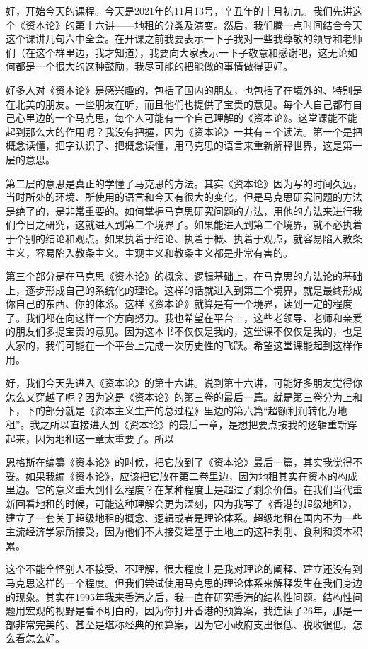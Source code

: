 \documentclass[UTF8, 12pt, a4paper]{ctexrep}
\begin{document}
好，开始今天的课程。今天是2021年的11月13号，辛丑年的十月初九。我们先讲这个《资本论》的第十六讲——地租的分类及演变。然后，我们腾一点时间结合今天这个课讲几句六中全会。在开课之前我要表示一下子我对一些我尊敬的领导和老师们（在这个群里边，我才知道），我要向大家表示一下子敬意和感谢吧，这无论如何都是一个很大的这种鼓励，我尽可能的把能做的事情做得更好。

好多人对《资本论》是感兴趣的，包括了国内的朋友，也包括了在境外的、特别是在北美的朋友。一些朋友在听，而且他们也提供了宝贵的意见。每个人自己都有自己心里边的一个马克思，每个人可能有一个自己理解的《资本论》。这堂课能不能起到那么大的作用呢？我没有把握，因为《资本论》一共有三个读法。第一个是把概念读懂，把字认识了、把概念读懂，用马克思的语言来重新解释世界，这是第一层的意思。

第二层的意思是真正的学懂了马克思的方法。其实《资本论》因为写的时间久远，当时所处的环境、所使用的语言和今天有很大的变化，但是马克思研究问题的方法是绝了的，是非常重要的。如何掌握马克思研究问题的方法，用他的方法来进行我们今日之研究，这就进入到第二个境界了。如果能进入到第二个境界，就不必执着于个别的结论和观点。如果执着于结论、执着于概、执着于观点，就容易陷入教条主义，容易陷入教条主义。主观主义和教条主义都是非常有害的。

第三个部分是在马克思《资本论》的概念、逻辑基础上，在马克思的方法论的基础上，逐步形成自己的系统化的理论。这样的话就进入到第三个境界，就是最终形成你自己的东西、你的体系。这样《资本论》就算是有一个境界，读到一定的程度了。我们都在向这样一个方向努力。我也希望在平台上，这些老领导、老师和亲爱的朋友们多提宝贵的意见。因为这本书不仅仅是我的，这堂课不仅仅是我的，也是大家的，我们可能在一个平台上完成一次历史性的飞跃。希望这堂课能起到这样作用。

好，我们今天先进入《资本论》的第十六讲。说到第十六讲，可能好多朋友觉得你怎么又穿越了呢？因为这是《资本论》的第三卷的最后一篇。就是第三卷分为上和下，下的部分就是《资本主义生产的总过程》里边的第六篇“超额利润转化为地租”。我之所以直接进入到《资本论》的最后一章，是想把要点按我的逻辑重新穿起来，因为地租这一章太重要了。所以

恩格斯在编纂《资本论》的时候，把它放到了《资本论》最后一篇，其实我觉得不妥。如果我编《资本论》，应该把它放在第二卷里边，因为地租其实在资本的构成里边。它的意义重大到什么程度？在某种程度上是超过了剩余价值。在我们当代重新回看地租的时候，可能这种理解会更为深刻，因为我写了《香港的超级地租》，建立了一套关于超级地租的概念、逻辑或者是理论体系。超级地租在国内不为一些主流经济学家所接受，因为他们不大接受建基于土地上的这种剥削、食利和资本积累。

这个不能全怪别人不接受、不理解，很大程度上是我对理论的阐释、建立还没有到马克思这样的一个程度。但我们尝试使用马克思的理论体系来解释发生在我们身边的现象。其实在1995年我来香港之后，我一直在研究香港的结构性问题。结构性问题用宏观的视野是看不明白的，因为你打开香港的预算案，我连读了26年，那是一部非常完美的、甚至是堪称经典的预算案，因为它小政府支出很低、税收很低，怎么看怎么好。
\end{document}
